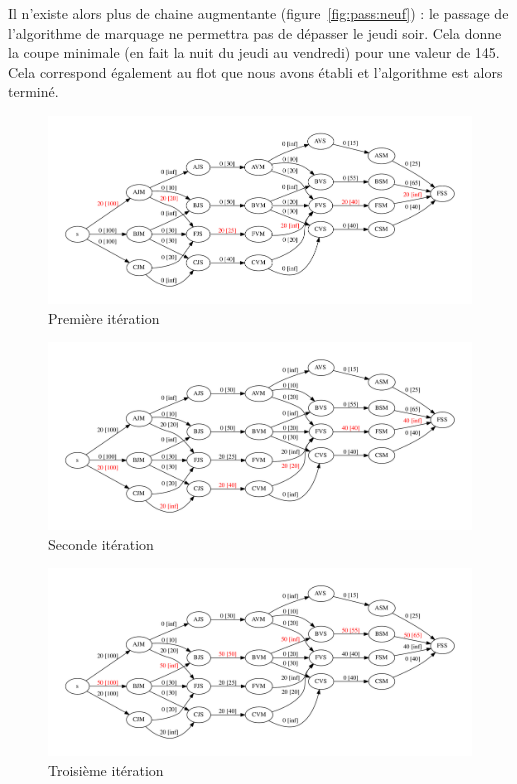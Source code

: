 Il n'existe alors plus de chaine augmentante (figure~\ref{fig:pass:neuf}) : le passage de l'algorithme de marquage ne permettra pas de dépasser le jeudi soir. Cela donne la coupe minimale (en fait la nuit du jeudi au vendredi) pour une valeur de 145. Cela correspond également au flot que nous avons établi et l'algorithme est alors terminé.


\begin{figure}[h]
\begin{center}
	\includegraphics[width=\textwidth]{figs/pass-2.pdf}
	\caption{Première itération}
	\label{fig:pass:deux}
\end{center}
\end{figure}

\begin{figure}[h]
\begin{center}
	\includegraphics[width=\textwidth]{figs/pass-3.pdf}
	\caption{Seconde itération}
	\label{fig:pass:trois}
\end{center}
\end{figure}

\begin{figure}[h]
\begin{center}
	\includegraphics[width=\textwidth]{figs/pass-4.pdf}
	\caption{Troisième itération}
	\label{fig:pass:quatre}
\end{center}
\end{figure}

